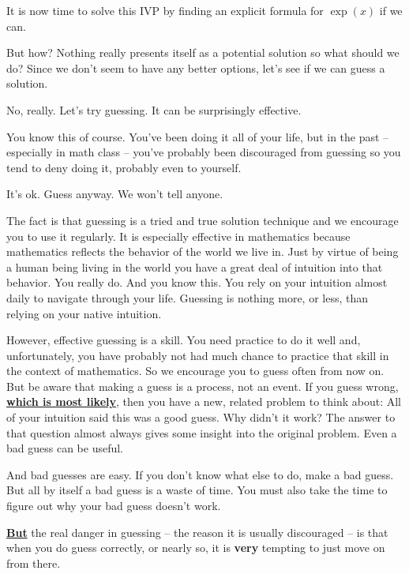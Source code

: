 It is now time to solve this IVP by finding an explicit  formula for
$\exp(x)$ if we can.

But how? Nothing really presents itself as a potential solution so
what should we do?
Since we don't seem to have any better options, let's see if we can 
guess a solution.
\vskip1mm{}
\begin{Digression}
  No, really. Let's try guessing. It can be surprisingly effective.

  You know this of course. You've been doing it all of your life, but
  in the past -- especially in math class -- you've probably been
  discouraged from guessing so you tend to deny doing it, probably
  even to yourself.

  It's ok. Guess anyway. We won't tell anyone.

  The fact is that guessing is a tried and true solution technique and
  we encourage you to use it regularly. It is especially effective in
  mathematics because mathematics reflects the behavior of the world
  we live in. Just by virtue of being a human being living in the
  world you have a great deal of intuition into that behavior. You
  really do. And you know this. You rely on your intuition almost
  daily to navigate through your life. Guessing is nothing more, or
  less, than relying on your native intuition.

  However, effective guessing is a skill. You need practice to do it
  well and, unfortunately, you have probably not had much
  chance to practice that skill in the context of mathematics.  So we
  encourage you to guess often from now on. But be aware that making a
  guess is a process, not an event. If you
  guess wrong, \underline{\bf{}which is most likely}, then you have a
  new, related problem to think about: All of your intuition said this
  was a good guess.  Why didn't it work?  The answer to that question
  almost always gives some insight into the original problem.  Even a
  bad guess can be useful.

  And bad guesses are easy. If you don't know what else to do, make a
  bad guess. But all by itself a bad guess is a waste of
  time. You must also take the time to figure out why your bad
  guess doesn't work.

  \underline{\large\bf But} the real danger in guessing -- the reason
  it is usually discouraged -- is that when you do guess correctly, or
  nearly so, it is {\bf very} tempting to just move on from
  there.


\end{Digression}
